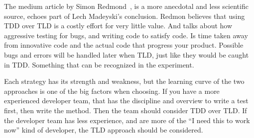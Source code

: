 The medium article by Simon Redmond~\cite{sr2019}, 
is a more anecdotal and less scientific source, echoes part of Lech Madeyski’s conclusion.
Redmon believes that using TDD over TLD is a costly effort for very little value. 
And talks about how aggressive testing for bugs, and writing code to satisfy code. 
Is time taken away from innovative code and the actual code that progress your product. 
Possible bugs and errors will be handled later when TLD, just like they would be caught in TDD. 
Something that can be recognized in the experiment. \newline

Each strategy has its strength and weakness, 
but the learning curve of the two approaches is one of the big 
factors when choosing. If you have a more experienced developer team, that has the discipline and overview to write a test first, then write the method. Then the team should consider TDD over TLD. If the developer team has less experience, and are more of the “I need this to work now” kind of developer, 
the TLD approach should be considered.  